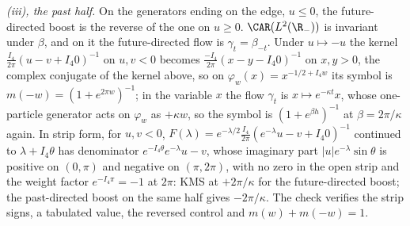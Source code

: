 \emph{(iii), the past half.} On the generators ending on the edge, $u \le 0$, the future-directed boost is the reverse of the one on $u \ge 0$. $\CAR(L^{2}(\R_{-}))$ is invariant under $\beta$, and on it the future-directed flow is $\gamma_{t} = \beta_{-t}$. Under $u \mapsto -u$ the kernel $\tfrac{I_{4}}{2\pi}(u - v + I_{4}0)^{-1}$ on $u, v < 0$ becomes $\tfrac{-I_{4}}{2\pi}(x - y - I_{4}0)^{-1}$ on $x, y > 0$, the complex conjugate of the kernel above, so on $\varphi_{w}(x) = x^{-1/2 + I_{4}w}$ its symbol is $m(-w) = (1 + e^{2\pi w})^{-1}$; in the variable $x$ the flow $\gamma_{t}$ is $x \mapsto e^{-\kappa t}x$, whose one-particle generator acts on $\varphi_{w}$ as $+\kappa w$, so the symbol is $(1 + e^{\beta h})^{-1}$ at $\beta = 2\pi/\kappa$ again. In strip form, for $u, v < 0$, $F(\lambda) = e^{-\lambda/2}\tfrac{I_{4}}{2\pi}(e^{-\lambda}u - v + I_{4}0)^{-1}$ continued to $\lambda + I_{4}\theta$ has denominator $e^{-I_{4}\theta}e^{-\lambda}u - v$, whose imaginary part $|u|e^{-\lambda}\sin\theta$ is positive on $(0, \pi)$ and negative on $(\pi, 2\pi)$, with no zero in the open strip and the weight factor $e^{-I_{4}\pi} = -1$ at $2\pi$: KMS at $+2\pi/\kappa$ for the future-directed boost; the past-directed boost on the same half gives $-2\pi/\kappa$. The check verifies the strip signs, a tabulated value, the reversed control and $m(w) + m(-w) = 1$.

